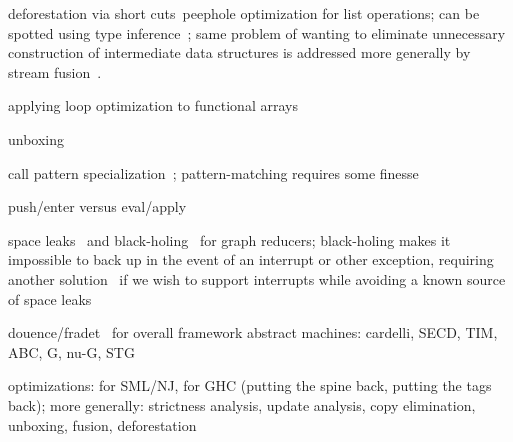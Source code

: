 deforestation via short cuts~\citep{Gill:A-short:1993}\empause peephole optimization for list operations; can be spotted using type inference~\citep{Chitil:Type:1999}; same problem of wanting to eliminate unnecessary construction of intermediate data structures is addressed more generally by stream fusion~\citep{Coutts:Stream:2007}.

applying loop optimization to functional arrays~\citep{Anderson:Compilation:1990}

unboxing~\citep{Peyton-Jones:Unboxed:1991,Thiemann:Unboxed:1995}

call pattern specialization~\citep{Peyton-Jones:Call-pattern:2007}; pattern-matching requires some finesse~\citep{Le-Fessant:Optimizing:2001}

push/enter versus eval/apply~\citep{Marlow:Making:2004}

space leaks~\citep{Wadler:Fixing:1987} and black-holing~\citep{Jones:Tail:1992} for graph reducers; black-holing makes it impossible to back up in the event of an interrupt or other exception, requiring another solution~\citep{Reid:Putting:1999} if we wish to support interrupts while avoiding a known source of space leaks

douence/fradet~\citep{Douence:A-systematic:1998} for overall framework
abstract machines: cardelli, SECD, TIM, ABC, G, nu-G, STG

optimizations: for SML/NJ, for GHC (putting the spine back, putting the tags back); more generally: strictness analysis, update analysis, copy elimination, unboxing, fusion, deforestation